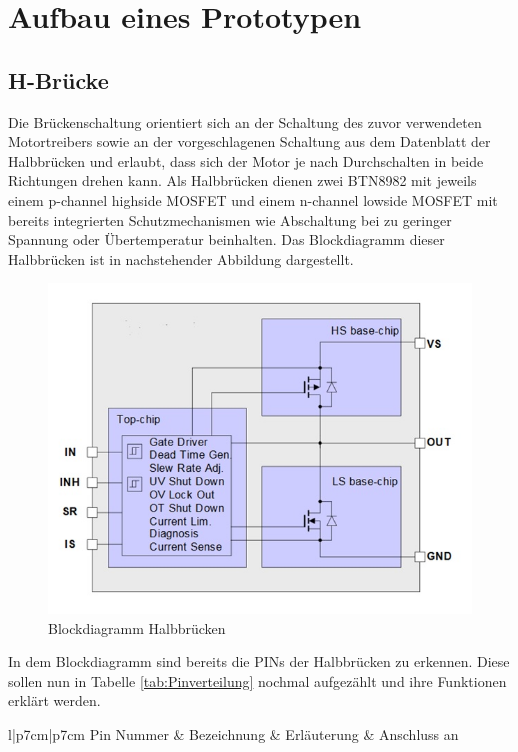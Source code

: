 \chapter{Aufbau eines Prototypen}
\section{H-Brücke}
Die Brückenschaltung orientiert sich an der Schaltung des zuvor verwendeten Motortreibers sowie an der vorgeschlagenen Schaltung aus dem Datenblatt der Halbbrücken und erlaubt, dass sich der Motor je nach Durchschalten in beide Richtungen drehen kann.
Als Halbbrücken dienen zwei BTN8982 mit jeweils einem p-channel highside MOSFET und einem n-channel lowside MOSFET mit bereits integrierten Schutzmechanismen wie Abschaltung bei zu geringer Spannung oder Übertemperatur beinhalten.  Das Blockdiagramm dieser Halbbrücken ist in nachstehender Abbildung dargestellt.
\begin{figure}[h]
	\centering
		\includegraphics{Bilder/Blockdiagramm Halbbruecken.jpg}
	\caption{Blockdiagramm Halbbrücken}
	\label{fig:Blockdiagramm Halbbruecken}
\end{figure}
In dem Blockdiagramm sind bereits die PINs der Halbbrücken zu erkennen. Diese sollen nun in Tabelle \ref{tab:Pinverteilung} nochmal aufgezählt und ihre Funktionen erklärt werden.

\begin{table}[h]
	\centering
		\begin{tabular}{l|p{7cm}|p{7cm}}
			Pin Nummer & Bezeichnung & Erläuterung & Anschluss an \\ \hline
		\end{tabular}
	\caption{Pinverteilung Halbbrücken}
	\label{tab:Pinverteilung}
\end{table}
